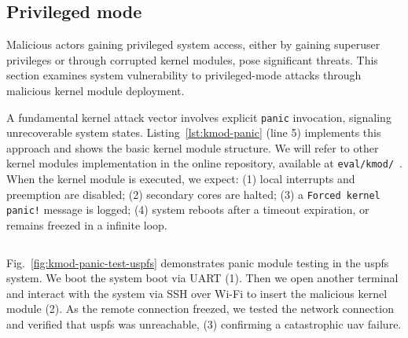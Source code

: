 \subsection{Privileged mode}
\label{sec:privileged-mode}
Malicious actors gaining privileged system access, either by gaining superuser
privileges or through corrupted kernel modules, pose significant threats. This
section examines system vulnerability to privileged-mode attacks through
malicious kernel module deployment.

A fundamental kernel attack vector involves explicit \lstinline{panic}
invocation, signaling unrecoverable system states.
Listing~\ref{lst:kmod-panic} (line 5) implements this approach and shows the
basic kernel module structure. We will refer to other kernel modules
implementation in the online repository, available at \lstinline{eval/kmod/}~\cite{thesis-sw-github}.
When the kernel module is executed, we expect: (1) local interrupts and
preemption are disabled; (2) secondary cores are halted; (3) a
\lstinline{Forced kernel panic!} message is logged; (4) system reboots after a
timeout expiration, or remains freezed in a infinite loop.

\begin{longlisting}
\centering
\inputminted[]{c}{./listing/kmod_panic.c}
\caption[Functional tests: implementation of the panic kernel module]{Functional
  tests: implementation of the Panic kernel module (see
  \lstinline{panic_module.c}~\cite{thesis-sw-github})}
\label{lst:kmod-panic}
\end{longlisting}

Fig.~\ref{fig:kmod-panic-test-uspfs} demonstrates panic module testing in the
\gls{uspfs} system. We boot the system boot via UART (1). Then we open another
terminal and interact with the system via SSH over Wi-Fi to insert the malicious
kernel module (2). As the remote connection freezed, we tested the network
connection and verified that \gls{uspfs} was unreachable, (3) confirming a
catastrophic \gls{uav} failure.

